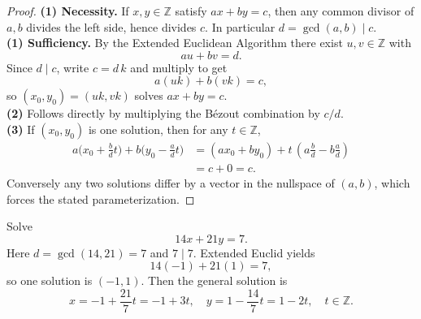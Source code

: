 \begin{proof}
\textbf{(1) Necessity.}  If $x,y\in\mathbb Z$ satisfy $a x + b y = c$, then any common divisor of $a,b$ divides the left side, hence divides $c$.  In particular $d=\gcd(a,b)\mid c$.\\

\noindent\textbf{(1) Sufficiency.}  By the Extended Euclidean Algorithm there exist $u,v\in\mathbb Z$ with
\[a u + b v = d.\]
Since $d\mid c$, write $c=d\,k$ and multiply to get
\[a(u k)+b(v k)=c,\]
so $(x_0,y_0)=(u k, v k)$ solves $a x+b y=c$.\\

\noindent\textbf{(2)} Follows directly by multiplying the Bézout combination by $c/d$.\\

\noindent\textbf{(3)} If $(x_0,y_0)$ is one solution, then for any $t\in\mathbb Z$,
\begin{align*}
  a\bigl(x_0+\tfrac{b}{d}t\bigr) + b\bigl(y_0-\tfrac{a}{d}t\bigr)
  &= (a x_0 + b y_0) + t\,(a\tfrac{b}{d}-b\tfrac{a}{d}) \\
  &= c + 0 = c.
\end{align*}
Conversely any two solutions differ by a vector in the nullspace of $(a,b)$, which forces the stated parameterization.
\end{proof}

\begin{example}
  Solve
  \[14x + 21y = 7.\]
  Here $d=\gcd(14,21)=7$ and $7\mid7$.  Extended Euclid yields
  \[14(-1)+21(1)=7,\]
  so one solution is $(-1,1)$.  Then the general solution is
  \[
  x=-1+\frac{21}{7}t = -1+3t,
  \quad
  y=1-\frac{14}{7}t = 1-2t,
  \quad
  t\in\mathbb Z.
  \]
\end{example}